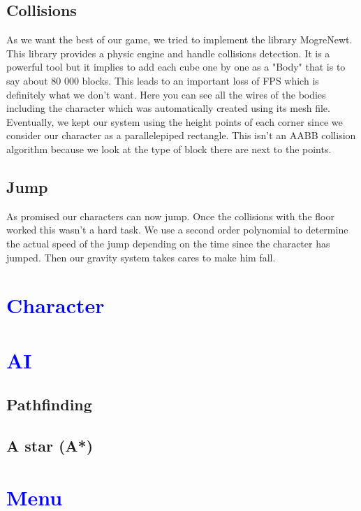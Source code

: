 \documentclass[article]{report} %
\begin{document}
			\section{Collisions}
				As we want the best of our game, we tried to implement the library MogreNewt. This library provides a physic engine and handle collisions detection. It is a powerful tool but it implies to add each cube one by one as a "Body" that is to say about 80 000 blocks. This leads to an important loss of FPS which is definitely what we don't want. Here you can see all the wires of the bodies including the character which was automatically created using its mesh file.\\

Eventually, we kept our system using the height points of each corner since we consider our character as a parallelepiped rectangle. This isn't an AABB collision algorithm because we look at the type of block there are next to the points.

			\section{Jump}
				As promised our characters can now jump. Once the collisions with the floor worked this wasn't a hard task. We use a second order polynomial to determine the actual speed of the jump depending on the time since the character has jumped. Then our gravity system takes cares to make him fall.
				
		\chapter{\textcolor{blue}{Character}}

		\chapter{\textcolor{blue}{AI}}
			\section{Pathfinding}
				
			\section{A star (A*)}
		
		\chapter{\textcolor{blue}{Menu}}
\end{document}
